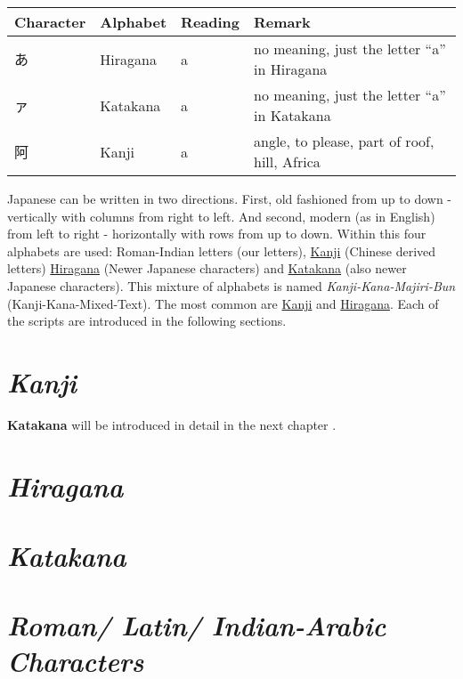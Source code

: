 \begin{center}
\begin{tabular}{|l|l|l|l|}
\textbf{Character}&\textbf{Alphabet}&\textbf{Reading}&\textbf{Remark}\\\hline
あ& Hiragana & a & no meaning, just the letter  ``a'' in Hiragana \\
ァ& Katakana & a & no meaning, just the letter ``a'' in Katakana \\
阿& Kanji    & a & { angle, to please, part of roof, hill, Africa}\\
\end{tabular}
\end{center}

Japanese can be written in two directions. First, old fashioned from up to down
- vertically with columns from right to left. And second, modern (as in
  English) from left to right - horizontally with rows from up to down. Within
  this four alphabets are used: Roman-Indian letters (our letters),
  \hyperref[sec:Kanji]{Kanji} (Chinese derived letters)
  \hyperref[sec:Hiragana]{Hiragana} (Newer Japanese characters) and
   \hyperref[sec:Katakana]{Katakana}  (also newer Japanese characters).  This
  mixture of alphabets is named \textit{Kanji-Kana-Majiri-Bun}
  (Kanji-Kana-Mixed-Text). The most common are \hyperref[sec:Kanji]{Kanji} and
  \hyperref[sec:Hiragana]{Hiragana}. Each of the scripts are introduced in the
  following sections.

\section*{\textit{Kanji}}


\textbf{Katakana} will be introduced in detail in the next chapter
.

\section*{\textit{Hiragana}}


\section*{\textit{Katakana}}


\section*{\textit{Roman/ Latin/ Indian-Arabic Characters}}


